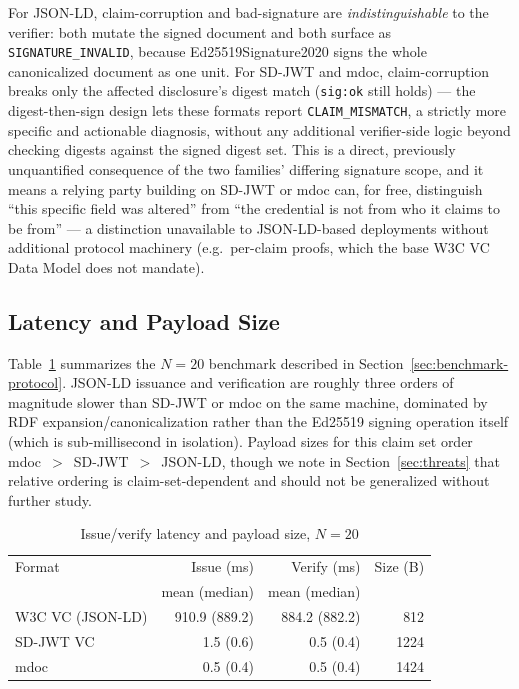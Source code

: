 \documentclass[conference]{IEEEtran}
\begin{document}
For JSON-LD, claim-corruption and bad-signature are \emph{indistinguishable} to the verifier: both mutate the signed document and both surface as \texttt{SIGNATURE\_INVALID}, because Ed25519Signature2020 signs the whole canonicalized document as one unit. For SD-JWT and mdoc, claim-corruption breaks only the affected disclosure's digest match (\texttt{sig:ok} still holds) --- the digest-then-sign design lets these formats report \texttt{CLAIM\_MISMATCH}, a strictly more specific and actionable diagnosis, without any additional verifier-side logic beyond checking digests against the signed digest set. This is a direct, previously unquantified consequence of the two families' differing signature scope, and it means a relying party building on SD-JWT or mdoc can, for free, distinguish ``this specific field was altered'' from ``the credential is not from who it claims to be from'' --- a distinction unavailable to JSON-LD-based deployments without additional protocol machinery (e.g.\ per-claim proofs, which the base W3C VC Data Model does not mandate).

\subsection{Latency and Payload Size}

Table~\ref{tab:bench} summarizes the $N=20$ benchmark described in Section~\ref{sec:benchmark-protocol}. JSON-LD issuance and verification are roughly three orders of magnitude slower than SD-JWT or mdoc on the same machine, dominated by RDF expansion/canonicalization rather than the Ed25519 signing operation itself (which is sub-millisecond in isolation). Payload sizes for this claim set order mdoc~$>$~SD-JWT~$>$~JSON-LD, though we note in Section~\ref{sec:threats} that relative ordering is claim-set-dependent and should not be generalized without further study.

\begin{table}[htbp]
\caption{Issue/verify latency and payload size, $N=20$}
\label{tab:bench}
\centering
\begin{tabular}{@{}lrrr@{}}
\toprule
Format & Issue (ms) & Verify (ms) & Size (B) \\
 & mean (median) & mean (median) & \\
\midrule
W3C VC (JSON-LD) & 910.9 (889.2) & 884.2 (882.2) & 812 \\
SD-JWT VC        & 1.5 (0.6)     & 0.5 (0.4)     & 1224 \\
mdoc              & 0.5 (0.4)     & 0.5 (0.4)     & 1424 \\
\bottomrule
\end{tabular}
\end{table}
\end{document}
